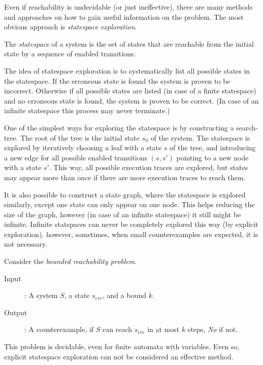 Even if reachability is undecidable (or just ineffective), there are many methods and approaches on how to gain useful information on the problem. The most obvious approach is \emph{statespace exploration}.

\begin{dfn}
	The \emph{statespace} of a system is the set of states that are reachable from the initial state by a sequence of enabled transitions. 
\end{dfn}

The idea of statespace exploration is to systematically list all possible states in the statespace. If the erroneous state is found the system is proven to be incorrect. Otherwise if all possible states are listed (in case of a finite statespace) and no erroneous state is found, the system is proven to be correct. (In case of an infinite statespace this process may never terminate.)

One of the simplest ways for exploring the statespace is by constructing a search-tree. The root of the tree is the initial state $s_0$ of the system. The statespace is explored by iteratively choosing a leaf with a state $s$ of the tree, and introducing a new edge for all possible enabled transitions $(s,s')$ pointing to a new node with a state $s'$. This way, all possible execution traces are explored, but states may appear more than once if there are more execution traces to reach them.

It is also possible to construct a state graph, where the statespace is explored similarly, except one state can only appear on one node. This helps reducing the size of the graph, however (in case of an infinite statespace) it still might be infinite. Infinite statspaces can never be completely explored this way (by explicit exploration), however, sometimes, when small counterexamples are expected, it is not necessary.

Consider the \emph{bounded reachability problem}.
\begin{description}
	\item[Input]: A system $S$, a state $s_{err}$, and a bound $k$.
	\item[Output]: A counterexample, if $S$ can reach $s_{err}$ in at most $k$ steps, \emph{No} if not.
\end{description}

This problem is decidable, even for finite automata with variables. Even so, explicit statespace exploration can not be considered an effective method.

